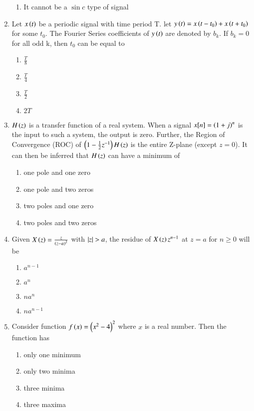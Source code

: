 \documentclass[journal,12pt,onecolumn]{IEEEtran}
\theoremstyle{remark}
\begin{document}
\begin{enumerate}
\begin{enumerate}
           \item It cannot be a $\sin c$ type of signal
      \end{enumerate}
      \item Let $x\left(t\right)$ be  a periodic signal with time period T. let $y\left(t\right)=x\left(t-t_0\right)+x\left(t+t_0\right)$ for some $t_0$. The Fourier Series coefficients of $y\left(t\right)$ are denoted by $b_k$. If $b_k=0$ for all odd k, then $t_0$ can be equal to 
      \begin{enumerate}
          \item $\frac{T}{8}$
          \item $\frac{T}{4}$
          \item $\frac{T}{2}$
          \item $2T$
      \end{enumerate}
      \item $H\left(z\right)$ is a transfer function of a real system. When a signal $x[n]=\left(1+j\right)^n$ is the input to such a system, the output is zero. Further, the Region of Convergence (ROC) of $\left(1-\frac{1}{2}z^{-1}\right)H\left(z\right)$ is the entire Z-plane (except $z=0$). It can then be inferred that $H\left(z\right)$ can have a minimum of
      \begin{enumerate}
          \item one pole and one zero
          \item one pole and two zeros
          \item two poles and one zero
          \item two poles and two zeros
      \end{enumerate}
      \item Given $X\left(z\right)=\frac{z}{\left(z-a\right)^2}$ with $\left\vert z\right\vert>a$, the residue of $X\left(z\right)z^{n-1}$ at $z=a$ for $n\geq 0$ will be
      \begin{enumerate}
          \item $a^{n-1}$
          \item $a^n$
          \item $n a^n$
          \item $na^{n-1}$
      \end{enumerate}
      \item Consider function $f\left(x\right)=\left(x^2-4\right)^2$ where $x$  is a real number. Then the function has
      \begin{enumerate}
          \item only one minimum
          \item only two minima
          \item three minima
          \item three maxima
      \end{enumerate}
\end{enumerate}
\end{document}
